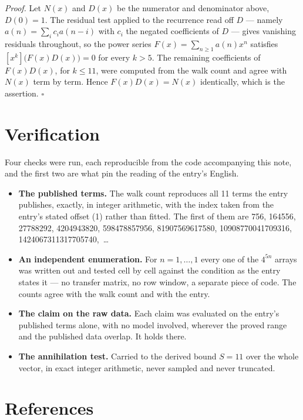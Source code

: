 \documentclass[11pt]{article}
\theoremstyle{definition}
\begin{document}
{\itshape Proof.} Let $N(x)$ and $D(x)$ be the numerator and denominator above, $D(0)=1$. The residual test applied to the recurrence read off $D$ --- namely $a(n) = \sum_i c_i a(n-i)$ with $c_i$ the negated coefficients of $D$ --- gives vanishing residuals throughout, so the power series $F(x)=\sum_{n\ge 1}a(n)x^n$ satisfies $[x^k]\bigl(F(x)D(x)\bigr) = 0$ for every $k > 5$. The remaining coefficients of $F(x)D(x)$, for $k \le 11$, were computed from the walk count and agree with $N(x)$ term by term. Hence $F(x)D(x) = N(x)$ identically, which is the assertion. $\square$

\section{Verification}

Four checks were run, each reproducible from the code accompanying this note, and the first two are what pin the reading of the entry's English.

\begin{itemize}

\item {\bfseries The published terms.} The walk count reproduces all 11 terms the entry publishes, exactly, in integer arithmetic, with the index taken from the entry's stated offset (1) rather than fitted. The first of them are 756, 164556, 27788292, 4204943820, 598478857956, 81907569617580, 10908770041709316, 1424067311317705740,~\dots

\item {\bfseries An independent enumeration.} For $n = 1,\dots,1$ every one of the $4^{5n}$ arrays was written out and tested cell by cell against the condition as the entry states it --- no transfer matrix, no row window, a separate piece of code. The counts agree with the walk count and with the entry.

\item {\bfseries The claim on the raw data.} Each claim was evaluated on the entry's published terms alone, with no model involved, wherever the proved range and the published data overlap. It holds there.

\item {\bfseries The annihilation test.} Carried to the derived bound $S = 11$ over the whole vector, in exact integer arithmetic, never sampled and never truncated.

\end{itemize}

\section{References}
\end{document}
